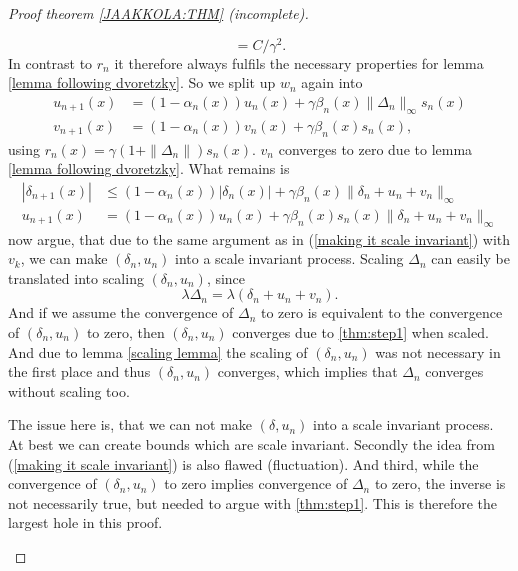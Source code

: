 \begin{proof}[Proof theorem \ref{JAAKKOLA:THM} (incomplete)]
\begin{enumerate}[label= Step \arabic*:, ref= Step \arabic*, leftmargin=0pt]
\[        =C/\gamma^2.
    \]
    In contrast to \(r_n\) it therefore always fulfils the necessary properties for lemma \ref{lemma following dvoretzky}. So we split up \(w_n\) again into
    \begin{align*}
        u_{n+1}(x)
        &=(1-\alpha_n(x))u_n(x) + \gamma\beta_n(x)\|\Delta_n\|_\infty s_n(x)\\ 
        v_{n+1}(x)
        &=(1-\alpha_n(x))v_n(x) +\gamma\beta_n(x) s_n(x),
    \end{align*}
    using \(r_n(x)=\gamma(1+\|\Delta_n\|)s_n(x)\). \(v_n\) converges to zero due to lemma \ref{lemma following dvoretzky}. What remains is 
    \begin{align*}
        |\delta_{n+1}(x)| 
        &\le (1-\alpha_n(x))|\delta_n(x)|+\gamma \beta_n(x)\|\delta_n+u_n+v_n\|_\infty\\
        u_{n+1}(x)
        &= (1-\alpha_n(x))u_n(x) +\gamma \beta_n(x)s_n(x)\|\delta_n+u_n+v_n\|_\infty
    \end{align*}
    \citeauthor{jaakkolaConvergenceStochasticIterative1994a} now argue, that due to the same argument as in (\ref{making it scale invariant}) with \(v_k\), we can make \((\delta_n, u_n)\) into a scale invariant process.
    Scaling \(\Delta_n\) can easily be translated into scaling \((\delta_n, u_n)\), since
    \[
        \lambda \Delta_n = \lambda (\delta_n + u_n + v_n).
    \]
    And if we assume the convergence of \(\Delta_n\) to zero is equivalent to the convergence of \((\delta_n, u_n)\) to zero, then \((\delta_n, u_n)\) converges due to \ref{thm:step1} when scaled. And due to lemma \ref{scaling lemma} the scaling of \((\delta_n, u_n)\) was not necessary in the first place and thus \((\delta_n, u_n)\) converges, which implies that \(\Delta_n\) converges without scaling too. 
    
    The issue here is, that we can not make \((\delta, u_n)\) into a scale invariant process. At best we can create bounds which are scale invariant. Secondly the idea from (\ref{making it scale invariant}) is also flawed (fluctuation). And third,  while the convergence of \((\delta_n, u_n)\) to zero implies convergence of \(\Delta_n\) to zero, the inverse is not necessarily true, but needed to argue with \ref{thm:step1}. This is therefore the largest hole in this proof. 
    

\end{enumerate}
\end{proof}
